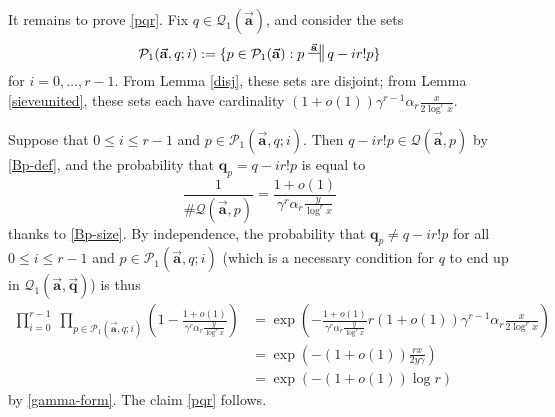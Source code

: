 \documentclass[12pt]{amsart}
\numberwithin{equation}{section}  %
\theoremstyle{remark}
\theoremstyle{plain}
\numberwithin{equation}{section}
\renewcommand{\leq}{\leqslant}
\renewcommand{\(}{\left(}
\renewcommand{\)}{\right)}
\newcommand{\relra}{\nsdtstile{}{\vect{\mathbf{a}}}} %
\newcommand{\vect}[1]{{\ensuremath{\vec{#1}}}}
\newcommand{\PP}{\mathcal{P}}
\newcommand{\QQ}{\mathcal{Q}}
\begin{document}
It remains to prove \eqref{pqr}.  Fix $q \in \QQ_1(\vect{\mathbf{a}})$, and consider the sets
$$ \PP_1(\vect{\mathbf{a}},q; i) := \{ p \in \PP_1(\vect{\mathbf{a}}):  p \relra q - ir! p \}$$
for $i=0,\dots,r-1$.  From Lemma \ref{disj}, these sets are disjoint; from Lemma \ref{sieveunited}, these sets each have cardinality $(1+o(1)) \gamma^{r-1} \alpha_r \frac{x}{2\log^r x}$.

Suppose that $0 \leq i \leq r-1$ and $p \in \PP_1(\vect{\mathbf{a}},q;
i)$.  Then $q-ir! p \in \QQ(\vect{\mathbf{a}},p)$ by \eqref{Bp-def},
and the probability that $\mathbf{q}_p=q-ir!p$ is equal to
$$  \frac{1}{\# \QQ(\vect{\mathbf{a}}, p)} = \frac{1+o(1)}{\gamma^r\alpha_r\frac y{\log^r x} }$$
thanks to \eqref{Bp-size}. By independence, the probability that $\mathbf{q}_p \neq q-ir!p$ for all $0 \leq i \leq r-1$ and $p \in \PP_1(\vect{\mathbf{a}},q;i)$ (which is a necessary condition for $q$ to end up in $\QQ_1(\vect{\mathbf{a}}, \vect{\mathbf{q}})$) is thus
\begin{align*}
 \prod_{i=0}^{r-1} \; \prod_{p \in \PP_1(\vect{\mathbf{a}},q; i)}\left( 1 - \frac{1+o(1)}{\gamma^{r} \alpha_r \frac{y}{\log^r x} } \right)
&= \exp\left( - \frac{1+o(1)}{\gamma^{r} \alpha_r \frac{y}{\log^r x} } r (1+o(1)) \gamma^{r-1}\alpha_r\frac x{2\log^r x} \right) \\
&= \exp\left( - (1+o(1)) \frac{rx}{2y\gamma} \right ) \\
&= \exp( - (1+o(1)) \log r )
\end{align*}
by \eqref{gamma-form}.  The claim \eqref{pqr} follows.
\end{document}
